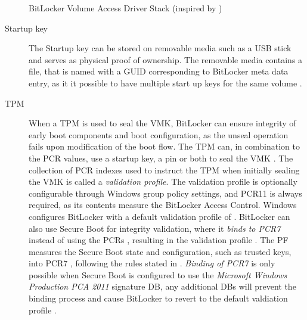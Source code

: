 \begin{figure}[htb]%
    \centering
    
    \caption[BitLocker Volume Access Driver Stack]{BitLocker Volume Access Driver Stack (inspired by \cite[Figure 9-24]{windows-internals-6-part2})}%
    \label{fig:bitlocker-volume-access-driver-stack}%
\end{figure}

\begin{description}
    \item[Startup key] The Startup key can be stored on removable media such as a \ac{USB} stick and serves as physical proof of ownership.
        The removable media contains a  file, that is named with a \ac{GUID} corresponding to BitLocker meta data entry, as it it possible to have multiple start up keys for the same volume \cite[Section 2.6]{bde-format-spec}\cite{microsoft-windows-prepare-your-org}.

    \item[TPM]
        When a \ac{TPM} is used to seal the \ac{VMK}, BitLocker can ensure integrity of early boot components and boot configuration, as the unseal operation fails upon modification of the boot flow.
        The \ac{TPM} can, in combination to the \ac{PCR} values, use a startup key, a pin or both to seal the \ac{VMK} \cite{microsoft-bitlocker-countermeasures}.
        The collection of \ac{PCR} indexes used to instruct the \ac{TPM} when initially sealing the \ac{VMK} is called a \emph{validation profile}.
        The validation profile is optionally configurable through Windows group policy settings, and \ac{PCR}11 is always required, as its contents measure the BitLocker Access Control.
        Windows configures BitLocker with a default validation profile of \hyperref[tab:pcr-usage]{} \cite{microsoft-windows-bitlocker-group-policy-settings}.
        BitLocker can also use Secure Boot for integrity validation, where it \hypertarget{pcr7-binding}{\emph{binds to \ac{PCR}7}} instead of using the \acp{PCR} \hyperref[tab:pcr-usage]{}, resulting in the validation profile \hyperref[tab:pcr-usage]{} \cite{microsoft-windows-bitlocker-group-policy-settings-pcr7}.
        The \ac{PF} measures the Secure Boot state and configuration, such as trusted keys, into \ac{PCR}7 \cite{microsoft-windows-bitlocker-group-policy-settings-pcr7}, following the rules stated in \cite{microsoft-trusted-execution-environment}.
        \emph{Binding of \ac{PCR}7} is only possible when Secure Boot is configured to use the \emph{Microsoft Windows Production PCA 2011} signature \ac{DB}, any additional \acp{DB} will prevent the binding process and cause BitLocker to revert to the default valdiation profile \cite{microsoft-pcr7-binding}.


\end{description}
